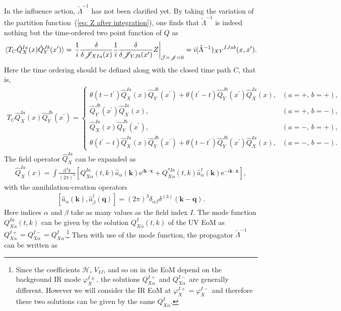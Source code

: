 \documentclass[a4paper,11pt]{article}
\newcommand{\var}[2]{\frac{\delta #1}{\delta #2}}
\newcommand{\dd}{\mathrm{d}}
\newcommand{\ee}{\mathrm{e}}
\newcommand{\dk}{\frac{\dd^3k}{(2\pi)^3}}
\newcommand{\dps}{\displaystyle}
\newcommand{\calH}{\mathcal{H}}
\newcommand{\calJ}{\mathcal{J}}
\newcommand{\scrJ}{\mathscr{J}}
\newcommand{\bae}[1]{\begin{align} #1 \end{align}}
\newcommand{\bce}[1]{\begin{cases} #1 \end{cases}}
\begin{document}
In the influence action, $\tilde{\Lambda}^{-1}$ has not been clarified yet. By taking the variation of the partition function~(\ref{eq: Z after integration}),
one finds that $\tilde{\Lambda}^{-1}$ is indeed nothing but the time-ordered two point function of $Q$ as
\bae{
	\braket{T_C\hat{Q}_X^{Ia}(x)\hat{Q}_Y^{Jb}(x^\prime)}
	=\left.\frac{1}{i}\var{}{\scrJ_{XIa}(x)}\frac{1}{i}\var{}{\scrJ_{YJb}(x^\prime)}Z\right|_{\calJ=\scrJ=0}
	=i(\tilde{\Lambda}^{-1})_{XY}{}^{IJab}(x,x^\prime).
}
Here the time ordering should be defined along with the closed time path $C$, that is,
\bae{
	T_C\hat{Q}_{X}^{Ia}(x)\hat{Q}_Y^{Jb}(x^\prime)=
	\bce{
		\dps
		\theta(t-t^\prime)\hat{Q}_{X}^{Ia}(x)\hat{Q}_Y^{Jb}(x^\prime)+\theta(t^\prime-t)\hat{Q}_Y^{Jb}(x^\prime)\hat{Q}_X^{Ia}(x), & (a=+,\,b=+), \\
		\dps
		\hat{Q}_Y^{Jb}(x^\prime)\hat{Q}_X^{Ia}(x), & (a=+,\,b=-), \\
		\dps
		\hat{Q}_X^{Ia}(x)\hat{Q}_Y^{Jb}(x^\prime), & (a=-,\,b=+), \\
		\dps
		\theta(t^\prime-t)\hat{Q}_{X}^{Ia}(x)\hat{Q}_Y^{Jb}(x^\prime)+\theta(t-t^\prime)\hat{Q}_Y^{Jb}(x^\prime)\hat{Q}_X^{Ia}(x), & (a=-,\,b=-).
	}
}
The field operator $\hat{Q}_X^{Ia}$ can be expanded as
\bae{\label{eq: mode expansion}
	\hat{Q}_X^{Ia}(x)=\int\dk\left[Q_{X\alpha}^{Ia}(t,k)\hat{a}_\alpha(\mathbf{k})\ee^{i\mathbf{k}\cdot\mathbf{x}}
	+Q_{X\alpha}^{*Ia}(t,k)\hat{a}^\dagger_\alpha(\mathbf{k})\ee^{-i\mathbf{k}\cdot\mathbf{x}}\right],
}
with the annihilation-creation operators
\bae{\label{eq: aadagger}
	[\hat{a}_\alpha(\mathbf{k}),\hat{a}^\dagger_\beta(\mathbf{q})]=(2\pi)^3\delta_{\alpha\beta}\delta^{(3)}(\mathbf{k}-\mathbf{q}).
}
Here indices $\alpha$ and $\beta$ take as many values as the field index $I$. The mode function $Q_{X\alpha}^{Ia}(t,k)$ can be given by
the solution $Q_{X\alpha}^I(t,k)$ of the UV EoM as $Q_{X\alpha}^{I+}=Q_{X\alpha}^{I-}=Q_{X\alpha}^I$.\footnote{Since
the coefficients $\calH$, $V_{IJ}$, and so on in the EoM depend on the background IR mode $\varphi_X^{I\pm}$,
the solutions $Q_{X\alpha}^{I+}$ and $Q_{X\alpha}^{I-}$ are generally different. However we will consider the IR EoM at 
$\varphi_X^{I+}=\varphi_X^{I-}$ and therefore these two solutions can be given by the same $Q_{X\alpha}^I$.}
Then with use of the mode function, the propagator $\tilde{\Lambda}^{-1}$ can be written as
\end{document}
